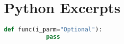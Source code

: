 \pagebreak
\section{Python Excerpts}
\begin{center}
	\begin{lstlisting}[caption={Python Placeholder},captionpos=b,language=python]
		def func(i_parm="Optional"):
			pass
	\end{lstlisting}
\end{center}

